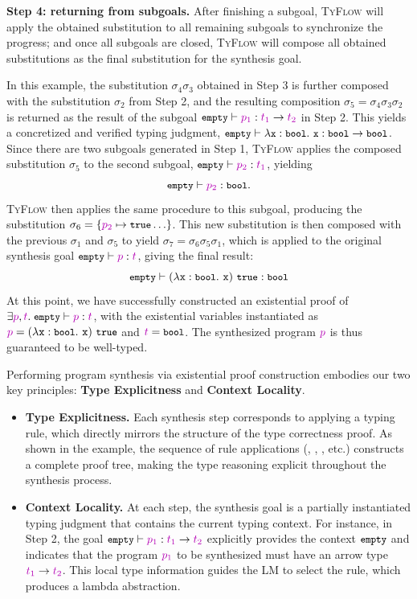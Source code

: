 \documentclass[manuscript,screen]{acmart}
\newcommand{\stlctype}[3]{{#1} \vdash {#2} : {#3}}
\newcommand{\sk}[1]{\textcolor{skunknown}{#1}}
\newcommand{\toolname}[1]{\textsc{#1}}
\newcommand{\tcode}[1]{{\small \texttt{\spaceskip=0.2em #1}}}
\newcommand{\mainname}{\toolname{TyFlow}\xspace}
\providecommand{\DIFaddbegin}{} %
\providecommand{\DIFaddincludegraphics}[2][]{{\color{blue}\fbox{\DIFOincludegraphics[#1]{#2}}}} %
\DeclareRobustCommand{\DIFaddbegin}{\DIFOaddbegin \let\includegraphics\DIFaddincludegraphics} %
\begin{document}
\smallskip \noindent \textbf{Step 4: returning from subgoals.}
After finishing a subgoal, \mainname will apply the obtained substitution to all remaining subgoals to synchronize the progress; and once all subgoals are closed, \mainname will compose all obtained substitutions as the final substitution for the synthesis goal.

In this example, the substitution $\sigma_4\sigma_3$ obtained in Step 3 is further composed with the substitution $\sigma_2$ from Step 2, and the resulting composition $\sigma_5 = \sigma_4\sigma_3\sigma_2$ is returned as the result of the subgoal $\stlctype{\tcode{empty}}{\sk{p_1}}{\arr{\sk{t_1}}{\sk{t_2}}}$ in Step 2. This yields a concretized and verified typing judgment, $\stlctype{\tcode{empty}}{\abs{\tcode{x}}{\tcode{bool}}{\tcode{x}}}{\arr{\tcode{bool}}{\tcode{bool}}}$.
%
Since there are two subgoals generated in Step 1, \mainname applies the composed substitution $\sigma_5$ to the second subgoal, $\stlctype{\tcode{empty}}{\sk{p_2}}{\sk{t_1}}$, yielding
\[
\stlctype{\tcode{empty}}{\sk{p_2}}{\tcode{bool}}.
\]
\mainname then applies the same procedure to this subgoal, producing the substitution 
$\sigma_6=\{\sk{p_2}\mapsto\tcode{true}\ldots\}$. 
This new substitution is then composed with the previous $\sigma_1$ and $\sigma_5$ to yield $\sigma_7=\sigma_6\sigma_5\sigma_1$, which is applied to the original
synthesis goal $\stlctype{\tcode{empty}}{\sk{p}}{\sk{t}}$, giving the final result:
\[
\stlctype{\tcode{empty}}{\app{(\abs{\texttt{x}}{\tcode{bool}}{\texttt{x}})}{\tcode{true}}}{\tcode{bool}}
\]
At this point, we have successfully constructed an existential proof of $\exists \sk{p}, \sk{t}.\; \stlctype{\tcode{empty}}{\sk{p}}{\sk{t}}$, with the existential variables instantiated as $\sk{p} = \app{(\abs{\texttt{x}}{\tcode{bool}}{\texttt{x}})}{\tcode{true}}$ and $\sk{t} = \tcode{bool}$. The synthesized program $\sk{p}$ is thus guaranteed to be well-typed.

Performing program synthesis via existential proof construction embodies our two key principles: \textbf{Type Explicitness} and \textbf{Context Locality}.
\begin{itemize}
    \item \textbf{Type Explicitness.} Each synthesis step corresponds to applying a typing rule, which directly mirrors the structure of the type correctness proof. As shown in the example, the sequence of rule applications (, , , etc.) constructs a complete proof tree, making the type reasoning explicit throughout the synthesis process.
    \item \textbf{Context Locality.} At each step, the synthesis goal is a partially instantiated typing judgment that contains the current typing context. For instance, in Step 2, the goal $\stlctype{\tcode{empty}}{\sk{p_1}}{\arr{\sk{t_1}}{\sk{t_2}}}$ explicitly provides the context $\tcode{empty}$ and indicates that the program $\sk{p_1}$ to be synthesized must have an arrow type $\arr{\sk{t_1}}{\sk{t_2}}$. This local type information guides the LM to select the  rule, which produces a lambda abstraction.
\end{itemize}
\DIFaddbegin 
\end{document}
